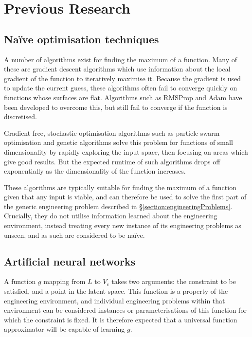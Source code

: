 \documentclass[../../main.tex]{subfiles}
\begin{document}
\chapter{Previous Research} \label{chapter:previousResearch}

\section{Na\"{i}ve optimisation techniques} \label{section:naiveOptimisationTechniques}

A number of algorithms exist for finding the maximum of a function.
Many of these are gradient descent algorithms \cite{ruder17} which use information about the local gradient of the function to iteratively maximise it.
Because the gradient is used to update the current guess, these algorithms often fail to converge quickly on functions whose surfaces are flat.
Algorithms such as RMSProp \cite{hinton17} and Adam \cite{kingma17} have been developed to overcome this, but still fail to converge if the function is discretised.

Gradient-free, stochastic optimisation algorithms such as particle swarm optimisation \cite{kennedy12} and genetic algorithms \cite{carr14} solve this problem for functions of small dimensionality by rapidly exploring the input space, then focusing on areas which give good results.
But the expected runtime of such algorithms drops off exponentially as the dimensionality of the function increases.

These algorithms are typically suitable for finding the maximum of a function given that any input is viable, and can therefore be used to solve the first part of the generic engineering problem described in \S\ref{section:engineeringProblems}.
Crucially, they do not utilise information learned about the engineering environment, instead treating every new instance of its engineering problems as unseen, and as such are considered to be na\"{i}ve.

\section{Artificial neural networks} \label{section:artificialNeuralNetworks}

A function $g$ mapping from $L$ to $V_c$ takes two arguments: the constraint to be satisfied, and a point in the latent space.
This function is a property of the engineering environment, and individual engineering problems within that environment can be considered instances or parameterisations of this function for which the constraint is fixed.
It is therefore expected that a universal function approximator will be capable of learning $g$.
\end{document}
